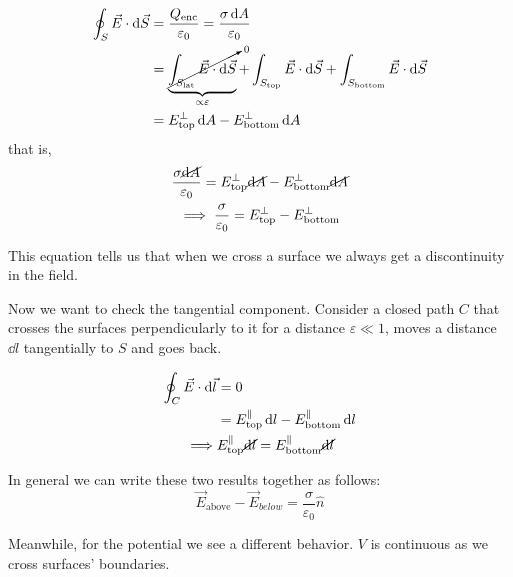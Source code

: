 \documentclass[12pt]{extarticle}
\begin{document}
\begin{align}
    \oint_S \vec E \cdot \dd{\vec S} & = \frac{Q_\text{enc}}{\varepsilon_0} = \frac{\sigma \dd{A}}{\varepsilon_0}                                                                                                                          \\
                                     & = \underbrace{\cancelto{{}_0}{\int_{S_\text{lat}} \vec E \cdot \dd{\vec S}}}_{\propto \varepsilon} + \int_{S_\text{top}} \vec E \cdot \dd{\vec S} + \int_{S_\text{bottom}} \vec E \cdot \dd{\vec S} \\
                                     & = E_\text{top}^\perp \dd{A} - E_\text{bottom}^\perp \dd{A}
\end{align}
that is,
\begin{gather}
    \frac{\sigma \cancel{\dd{A}}}{\varepsilon_0} = E_\text{top}^\perp \cancel{\dd{A}} - E_\text{bottom}^\perp \cancel{\dd{A}}\\
    \implies \frac{\sigma}{\varepsilon_0} = E_\text{top}^\perp - E_\text{bottom}^\perp
\end{gather}

This equation tells us that when we cross a surface we always get a discontinuity in the field.

Now we want to check the tangential component.
Consider a closed path $C$ that crosses the surfaces perpendicularly to it for a distance $\varepsilon \ll 1$, moves a distance $\dd{l}$ tangentially to $S$ and goes back.

\begin{align}
    \oint_C \vec E \cdot \dd{\vec l} & = 0                                                                                \\
                                     & = E_\text{top}^\parallel \dd{l} - E_\text{bottom}^\parallel \dd{l}                 \\
    \implies                         & E_\text{top}^\parallel \cancel{\dd{l}} = E_\text{bottom}^\parallel \cancel{\dd{l}}
\end{align}

In general we can write these two results together as follows:
\begin{equation}
    \vec E_\text{above} - \vec E_{below} = \frac{\sigma}{\varepsilon_0} \hat n
\end{equation}

Meanwhile, for the potential we see a different behavior. $V$ is continuous as we cross surfaces' boundaries.
\end{document}
